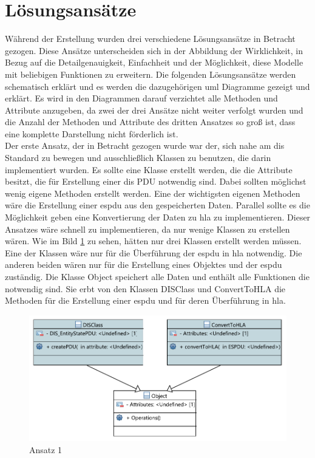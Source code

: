 \section{Lösungsansätze}\label{lös}
Während der Erstellung wurden drei verschiedene Lösungsansätze in Betracht gezogen.
Diese Ansätze unterscheiden sich in der Abbildung der Wirklichkeit, in Bezug auf die Detailgenauigkeit, Einfachheit und der Möglichkeit, diese Modelle mit beliebigen Funktionen zu erweitern. Die folgenden Lösungsansätze werden schematisch erklärt und es werden die dazugehörigen \ac{uml} Diagramme gezeigt und erklärt. Es wird in den Diagrammen darauf verzichtet alle Methoden und Attribute anzugeben, da zwei der drei Ansätze nicht weiter verfolgt wurden und die Anzahl der Methoden und Attribute des dritten Ansatzes so groß ist, dass eine komplette Darstellung nicht förderlich ist.\\
Der erste Ansatz, der in Betracht gezogen wurde war der, sich nahe am \ac{dis} Standard zu bewegen und ausschließlich Klassen zu benutzen, die darin implementiert wurden. Es sollte eine Klasse erstellt werden, die die Attribute besitzt, die für Erstellung einer \ac{dis} PDU notwendig sind. Dabei sollten möglichst wenig eigene Methoden erstellt werden. Eine der wichtigsten eigenen Methoden wäre die Erstellung einer \ac{espdu} aus den gespeicherten Daten. Parallel sollte es die Möglichkeit geben eine Konvertierung der Daten zu \ac{hla} zu implementieren. Dieser Ansatzes wäre schnell zu implementieren, da nur wenige Klassen zu erstellen wären.  Wie im Bild \ref{ansatz1} zu sehen, hätten nur drei Klassen erstellt werden müssen. Eine der Klassen wäre nur für die Überführung der \ac{espdu} in \ac{hla} notwendig. Die anderen beiden wären nur für die Erstellung eines Objektes und der \ac{espdu} zuständig. 
Die Klasse \glqq Object\grqq{} speichert alle Daten und enthält alle Funktionen die notwendig sind. Sie erbt von den Klassen  \glqq DISClass\grqq{} und  \glqq ConvertToHLA\grqq{} die Methoden für die Erstellung einer \ac{espdu} und für deren Überführung in \ac{hla}. 
 \begin{figure}[H]
	\centering
	\includegraphics[scale=0.9]{bilder/pdfvorlagen/ansatz2}
	\caption[Ansatz 1]{Ansatz 1}
	\label{ansatz1}
\end{figure}

